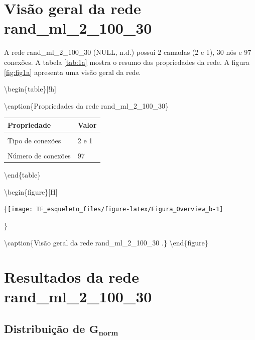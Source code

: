 \documentclass[
  12pt,
]{article}
\begin{document}
\pagebreak

\hypertarget{visuxe3o-geral-da-rede-rand_ml_2_100_30}{%
\section{Visão geral da rede
rand\_ml\_2\_100\_30}\label{visuxe3o-geral-da-rede-rand_ml_2_100_30}}

A rede rand\_ml\_2\_100\_30 (NULL, n.d.) possui 2 camadas (2 e 1), 30
nós e 97 conexões. A tabela \ref{tab:1a} mostra o resumo das
propriedades da rede. A figura \ref{fig:fig1a} apresenta uma visão geral
da rede.

\textbackslash begin\{table\}{[}!h{]}

\textbackslash caption\{\label{tab:Tabela_Prop_Rede_b}\label{tab:1a}Propriedades
da rede rand\_ml\_2\_100\_30\} \centering

\begin{tabular}[t]{ll}
\toprule
Propriedade & Valor\\
\midrule
\cellcolor{gray!6}{Número de Camadas} & \cellcolor{gray!6}{2}\\
Tipo de conexões & 2  e  1\\
\cellcolor{gray!6}{Número de nós} & \cellcolor{gray!6}{30}\\
Número de conexões & 97\\
\bottomrule
\end{tabular}

\textbackslash end\{table\}

\textbackslash begin\{figure\}{[}H{]}

\{\centering \texttt{[image: TF\_esqueleto\_files/figure-latex/Figura\_Overview\_b-1]}

\}

\textbackslash caption\{\label{fig:fig1a}Visão geral da rede
rand\_ml\_2\_100\_30 .\}\label{fig:Figura_Overview_b}
\textbackslash end\{figure\}

\hypertarget{resultados-da-rede-rand_ml_2_100_30}{%
\section{Resultados da rede
rand\_ml\_2\_100\_30}\label{resultados-da-rede-rand_ml_2_100_30}}

\hypertarget{distribuiuxe7uxe3o-de-mathbfg_norm-1}{%
\subsection{\texorpdfstring{Distribuição de
\(\mathbf{G_{norm}}\)}{Distribuição de \textbackslash mathbf\{G\_\{norm\}\}}}\label{distribuiuxe7uxe3o-de-mathbfg_norm-1}}
\end{document}
